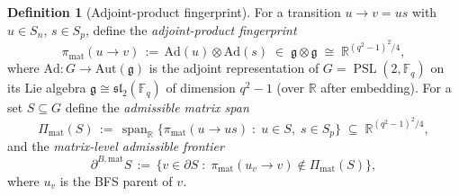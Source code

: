\documentclass[11pt]{article}
\theoremstyle{definition}
\newtheorem{definition}[theorem]{Definition}
\theoremstyle{remark}
\DeclareMathOperator{\spn}{span}
\DeclareMathOperator{\PSL}{PSL}
\newcommand{\R}{\mathbb{R}}
\newcommand{\F}{\mathbb{F}}
\begin{document}
    \begin{definition}[Adjoint-product fingerprint]
      \label{def:fingerprint}
      For a transition $u \to v = us$ with $u \in S_n$, $s \in S_p$, define the
      \emph{adjoint-product fingerprint}
      \begin{equation}
        \label{eq:fingerprint}
        \pi_{\mathrm{mat}}(u \to v) \,:=\, \mathrm{Ad}(u) \otimes \mathrm{Ad}(s)
        \;\in\; \mathfrak{g} \otimes \mathfrak{g} \;\cong\; \R^{(q^2-1)^2/4},
      \end{equation}
      where $\mathrm{Ad}: G \to \mathrm{Aut}(\mathfrak{g})$ is the adjoint representation
      of $G = \PSL(2, \F_q)$ on its Lie algebra $\mathfrak{g} \cong \mathfrak{sl}_2(\F_q)$
      of dimension $q^2 - 1$ (over $\R$ after embedding).
      For a set $S \subseteq G$ define the \emph{admissible matrix span}
      \begin{equation}
        \Pi_{\mathrm{mat}}(S) \,:=\, \spn_\R
        \bigl\{ \pi_{\mathrm{mat}}(u \to us) \;:\; u \in S,\; s \in S_p \bigr\}
        \;\subseteq\; \R^{(q^2-1)^2/4},
      \end{equation}
      and the \emph{matrix-level admissible frontier}
      \begin{equation}
        \partial^{B,\mathrm{mat}} S
        \,:=\, \bigl\{ v \in \partial S \;:\;
        \pi_{\mathrm{mat}}(u_v \to v) \notin \Pi_{\mathrm{mat}}(S) \bigr\},
      \end{equation}
      where $u_v$ is the BFS parent of $v$.
    \end{definition}
\end{document}
